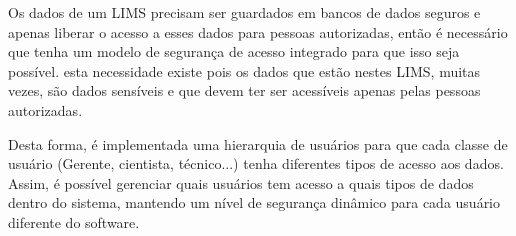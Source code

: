 

Os dados de um LIMS precisam ser guardados em bancos de dados seguros e apenas liberar o acesso a esses dados para pessoas autorizadas, então é necessário que tenha um modelo de segurança de acesso integrado para que isso seja possível. esta necessidade existe pois os dados que estão nestes LIMS, muitas vezes, são dados sensíveis e que devem ter ser acessíveis apenas pelas pessoas autorizadas.


Desta forma, é implementada uma hierarquia de usuários para que cada classe de usuário (Gerente, cientista, técnico...) tenha diferentes tipos de acesso aos dados. Assim, é possível gerenciar quais usuários tem acesso a quais tipos de dados dentro do sistema, mantendo um nível de segurança dinâmico para cada usuário diferente do software.







